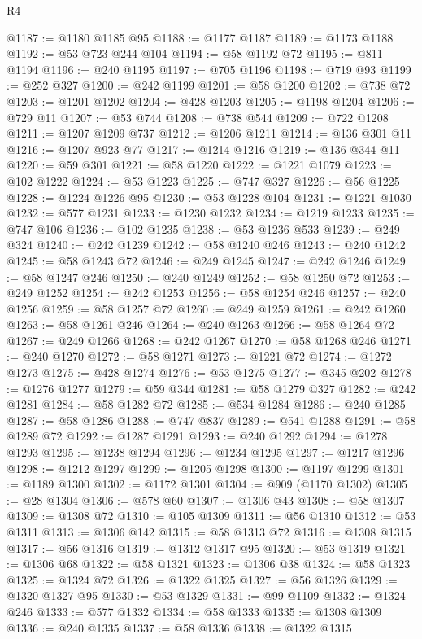 \begin{lexlean}{R4}
\begin{coremodule}
@1187 := @1180 @1185 @95
@1188 := @1177 @1187
@1189 := @1173 @1188
@1192 := @53 @723 @244 @104
@1194 := @58 @1192 @72
@1195 := @811 @1194
@1196 := @240 @1195
@1197 := @705 @1196
@1198 := @719 @93
@1199 := @252 @327
@1200 := @242 @1199
@1201 := @58 @1200
@1202 := @738 @72
@1203 := @1201 @1202
@1204 := @428 @1203
@1205 := @1198 @1204
@1206 := @729 @11
@1207 := @53 @744
@1208 := @738 @544
@1209 := @722 @1208
@1211 := @1207 @1209 @737
@1212 := @1206 @1211
@1214 := @136 @301 @11
@1216 := @1207 @923 @77
@1217 := @1214 @1216
@1219 := @136 @344 @11
@1220 := @59 @301
@1221 := @58 @1220
@1222 := @1221 @1079
@1223 := @102 @1222
@1224 := @53 @1223
@1225 := @747 @327
@1226 := @56 @1225
@1228 := @1224 @1226 @95
@1230 := @53 @1228 @104
@1231 := @1221 @1030
@1232 := @577 @1231
@1233 := @1230 @1232
@1234 := @1219 @1233
@1235 := @747 @106
@1236 := @102 @1235
@1238 := @53 @1236 @533
@1239 := @249 @324
@1240 := @242 @1239
@1242 := @58 @1240 @246
@1243 := @240 @1242
@1245 := @58 @1243 @72
@1246 := @249 @1245
@1247 := @242 @1246
@1249 := @58 @1247 @246
@1250 := @240 @1249
@1252 := @58 @1250 @72
@1253 := @249 @1252
@1254 := @242 @1253
@1256 := @58 @1254 @246
@1257 := @240 @1256
@1259 := @58 @1257 @72
@1260 := @249 @1259
@1261 := @242 @1260
@1263 := @58 @1261 @246
@1264 := @240 @1263
@1266 := @58 @1264 @72
@1267 := @249 @1266
@1268 := @242 @1267
@1270 := @58 @1268 @246
@1271 := @240 @1270
@1272 := @58 @1271
@1273 := @1221 @72
@1274 := @1272 @1273
@1275 := @428 @1274
@1276 := @53 @1275
@1277 := @345 @202
@1278 := @1276 @1277
@1279 := @59 @344
@1281 := @58 @1279 @327
@1282 := @242 @1281
@1284 := @58 @1282 @72
@1285 := @534 @1284
@1286 := @240 @1285
@1287 := @58 @1286
@1288 := @747 @837
@1289 := @541 @1288
@1291 := @58 @1289 @72
@1292 := @1287 @1291
@1293 := @240 @1292
@1294 := @1278 @1293
@1295 := @1238 @1294
@1296 := @1234 @1295
@1297 := @1217 @1296
@1298 := @1212 @1297
@1299 := @1205 @1298
@1300 := @1197 @1299
@1301 := @1189 @1300
@1302 := @1172 @1301
@1304 := @909 (@1170 @1302)
@1305 := @28 @1304
@1306 := @578 @60
@1307 := @1306 @43
@1308 := @58 @1307
@1309 := @1308 @72
@1310 := @105 @1309
@1311 := @56 @1310
@1312 := @53 @1311
@1313 := @1306 @142
@1315 := @58 @1313 @72
@1316 := @1308 @1315
@1317 := @56 @1316
@1319 := @1312 @1317 @95
@1320 := @53 @1319
@1321 := @1306 @68
@1322 := @58 @1321
@1323 := @1306 @38
@1324 := @58 @1323
@1325 := @1324 @72
@1326 := @1322 @1325
@1327 := @56 @1326
@1329 := @1320 @1327 @95
@1330 := @53 @1329
@1331 := @99 @1109
@1332 := @1324 @246
@1333 := @577 @1332
@1334 := @58 @1333
@1335 := @1308 @1309
@1336 := @240 @1335
@1337 := @58 @1336
@1338 := @1322 @1315

\end{coremodule}
\end{lexlean}
